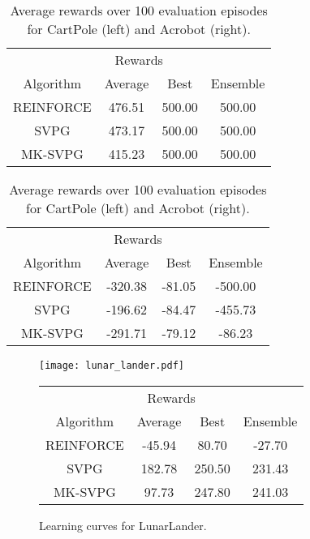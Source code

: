 \begin{table}[h!]
\parbox{.45\columnwidth}{
\centering
\begin{tabular}{cccc}
    \toprule
    \multicolumn{4}{c}{\hspace{2.2cm} Rewards} \\
    \cmidrule{2-4}
    Algorithm & Average & Best & Ensemble \\
    \midrule
    REINFORCE & 476.51 & 500.00 & 500.00 \\
    SVPG & 473.17 & 500.00 & 500.00 \\
    MK-SVPG & 415.23 & 500.00 & 500.00 \\
    \bottomrule
\end{tabular}
}
\hfill
\parbox{.45\columnwidth}{
\centering
\begin{tabular}{cccc}
    \toprule
    \multicolumn{4}{c}{\hspace{2.2cm} Rewards} \\
    \cmidrule{2-4}
    Algorithm & Average & Best & Ensemble \\
    \midrule
    REINFORCE & -320.38 & -81.05 & -500.00 \\
    SVPG & -196.62 & -84.47 & -455.73 \\
    MK-SVPG & -291.71 & -79.12 & -86.23 \\
    \bottomrule
\end{tabular}
}
\caption{\label{tab:rl_results} Average rewards over 100 evaluation episodes for CartPole (left) and Acrobot (right).}
\end{table}

\begin{figure}[h!]
  \begin{minipage}{0.5\textwidth}
    \centering
    \texttt{[image: lunar\_lander.pdf]}
    \caption{Learning curves for LunarLander.}
    \label{fig:lunar_lander}
  \end{minipage}%
  \begin{minipage}{0.5\textwidth}
    \centering
	\begin{tabular}{cccc}
	    \toprule
	    \multicolumn{4}{c}{\hspace{2.2cm} Rewards} \\
	    \cmidrule{2-4}
	    Algorithm & Average & Best & Ensemble \\
	    \midrule
	    REINFORCE & -45.94 & 80.70 & -27.70 \\
	    SVPG & 182.78 & 250.50 & 231.43 \\
	    MK-SVPG & 97.73 & 247.80 & 241.03\\
	    \bottomrule
	\end{tabular}
    \label{tab:lunar_lander}
  \end{minipage}
\end{figure}


